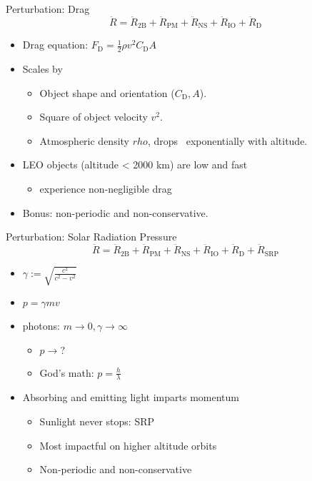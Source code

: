 \documentclass[pdf]{beamer}
\begin{document}
\begin{frame}{Perturbation: Drag}
  \[ \ddot{R} = \ddot{R}_\text{2B} + \ddot{R}_\text{PM} + \ddot{R}_\text{NS}  + \ddot{R}_\text{IO} + \ddot{R}_\text{D} \]

  \begin{itemize}
  \item Drag equation: $F_\text{D} = \frac{1}{2}\rho v^2 C_\text{D} A$
  \item Scales by
    \begin{itemize}
    \item Object shape and orientation ($C_\text{D}, A$).
    \item Square of object velocity $v^2$.
    \item Atmospheric density $rho$, drops ~exponentially with altitude.
    \end{itemize}
  \item LEO objects (altitude < 2000 km) are low and fast
    \begin{itemize}
    \item experience non-negligible drag
    \end{itemize}
  \item Bonus: non-periodic and non-conservative.
  \end{itemize}
\end{frame}

\begin{frame}{Perturbation: Solar Radiation Pressure}
  \[ \ddot{R} = \ddot{R}_\text{2B} + \ddot{R}_\text{PM} + \ddot{R}_\text{NS}  + \ddot{R}_\text{IO} + \ddot{R}_\text{D} + \ddot{R}_\text{SRP}\]

  \begin{itemize}
  \item $\gamma := \sqrt{\frac{c^2}{c^2 - v^2}}$
  \item $ p = \gamma m v$
  \item photons: $m\rightarrow0, \gamma \rightarrow \infty $
    \begin{itemize}
    \item $p \rightarrow ?$
    \item God's math: $ p = \frac{h}{\lambda} $
    \end{itemize}
  \item Absorbing and emitting light imparts momentum
    \begin{itemize}
    \item Sunlight never stops: SRP
    \item Most impactful on higher altitude orbits
    \item Non-periodic and non-conservative
    \end{itemize}
  \end{itemize}
\end{frame}
\end{document}
